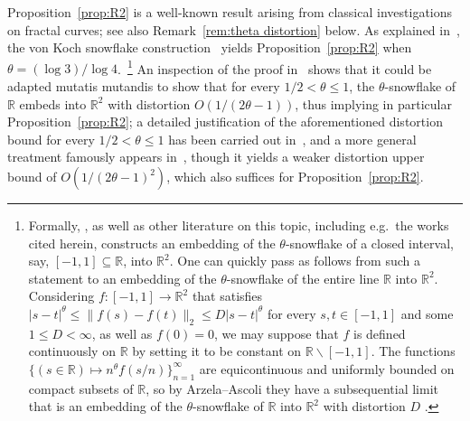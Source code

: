 \documentclass[11pt,reqno]{amsart}
\newcommand{\R}{\mathbb{R}}
\renewcommand{\le}{\leqslant}
\renewcommand{\setminus}{\smallsetminus}
\renewcommand{\subset}{\subseteq}
\newcommand{\1}{\mathbf{1}}
\begin{document}
Proposition~\ref{prop:R2} is a well-known result arising from classical investigations on fractal curves; see also Remark~\ref{rem:theta distortion} below. As explained in~\cite{Gla58}, the von Koch snowflake construction~\cite{Koc06} yields Proposition~\ref{prop:R2} when $\theta=(\log 3)/\log 4$.~\footnote{Formally, \cite{Gla58}, as well as other literature on this topic, including e.g.~the works~\cite{Assouad,DH99,HM12} cited herein,  constructs an embedding of the $\theta$-snowflake of a closed interval, say,  $[-1,1]\subset \R$,  into $\R^2$. One can quickly pass as follows from such a statement to an embedding of the $\theta$-snowflake of the entire line $\R$ into $\R^2$. Considering  $f:[-1,1]\to \R^2$ that satisfies $|s-t|^\theta \le \|f(s)-f(t)\|_2\le D|s-t|^\theta$ for every $s,t\in [-1,1]$ and some $1\le D<\infty$, as well as $f(0)=0$, we may suppose that $f$ is defined continuously on  $\R$  by setting it to be constant on $\R\setminus [-1,1]$. The functions $\{(s\in \R)\mapsto n^\theta f(s/n)\}_{n=1}^\infty$ are equicontinuous and uniformly bounded on compact subsets of $\R$, so by Arzela--Ascoli they have a subsequential limit that is an embedding of the $\theta$-snowflake of $\R$ into $\R^2$ with distortion $D$ .}   An inspection of the proof in~\cite{Gla58} shows that it could be adapted mutatis mutandis to show   that for every $1/2<\theta\le 1$, the $\theta$-snowflake of $\R$ embeds into $\R^2$ with distortion $O(1/(2\theta-1))$, thus implying in particular Proposition~\ref{prop:R2}; a detailed justification of the  aforementioned distortion  bound for every $1/2<\theta\le 1$ has been carried out in~\cite{DH99,HM12}, and a more general treatment famously appears in~\cite{Assouad}, though it yields a weaker distortion upper bound of $O(1/(2\theta-1)^2)$, which also suffices for Proposition~\ref{prop:R2}. 
\end{document}
